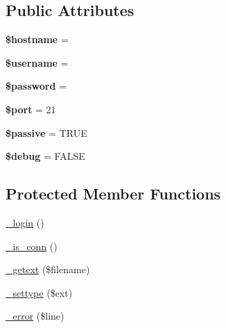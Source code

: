 \subsection*{Public Attributes}
\begin{DoxyCompactItemize}
\item 
\mbox{\label{class_c_i___f_t_p_a979ef6014db74e37b10ec6bbbe8dffb7}} 
{\bfseries \$hostname} = \textquotesingle{}\textquotesingle{}
\item 
\mbox{\label{class_c_i___f_t_p_a534dfb7556d0fa90deedf454fd8356e4}} 
{\bfseries \$username} = \textquotesingle{}\textquotesingle{}
\item 
\mbox{\label{class_c_i___f_t_p_a6c92a3db0ce2ac570f50505ac5910917}} 
{\bfseries \$password} = \textquotesingle{}\textquotesingle{}
\item 
\mbox{\label{class_c_i___f_t_p_a2e5b9aacb9065c7a49142f1a50fc3946}} 
{\bfseries \$port} = 21
\item 
\mbox{\label{class_c_i___f_t_p_a80844b7f4380134e7c8e9b5083cdf881}} 
{\bfseries \$passive} = T\+R\+UE
\item 
\mbox{\label{class_c_i___f_t_p_a07cf4628fdd38ff99f3f2b305e566ccc}} 
{\bfseries \$debug} = F\+A\+L\+SE
\end{DoxyCompactItemize}
\subsection*{Protected Member Functions}
\begin{DoxyCompactItemize}
\item 
\mbox{\hyperlink{class_c_i___f_t_p_a37e50e6476719425d21354883f5e0a73}{\+\_\+login}} ()
\item 
\mbox{\hyperlink{class_c_i___f_t_p_a6f5208a2267e9b32bd478281c131d1d6}{\+\_\+is\+\_\+conn}} ()
\item 
\mbox{\hyperlink{class_c_i___f_t_p_aff9447150095a05eedd03153a6ae3ce6}{\+\_\+getext}} (\$filename)
\item 
\mbox{\hyperlink{class_c_i___f_t_p_a114235df43bcf60d12687f09c2bfaaca}{\+\_\+settype}} (\$ext)
\item 
\mbox{\hyperlink{class_c_i___f_t_p_aff22e8ded1e2061f7674e9f183771b4d}{\+\_\+error}} (\$line)
\end{DoxyCompactItemize}
